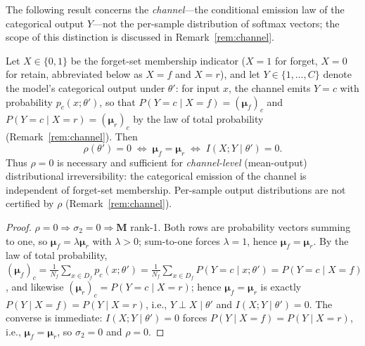 \documentclass[smallextended]{svjour3}       %
\begin{document}
The following result concerns the \emph{channel}---the conditional emission law of the categorical output $Y$---not the per-sample distribution of softmax vectors; the scope of this distinction is discussed in Remark~\ref{rem:channel}.

\begin{theorem}
\label{thm:perfect}
Let $X\in\{0,1\}$ be the forget-set membership indicator ($X{=}1$ for forget, $X{=}0$ for retain, abbreviated below as $X{=}f$ and $X{=}r$), and let $Y\in\{1,\dots,C\}$ denote the model's categorical output under $\theta'$: for input $x$, the channel emits $Y{=}c$ with probability $p_c(x;\theta')$, so that $P(Y{=}c\mid X{=}f)=(\boldsymbol{\mu}_f)_c$ and $P(Y{=}c\mid X{=}r)=(\boldsymbol{\mu}_r)_c$ by the law of total probability (Remark~\ref{rem:channel}). Then
\begin{equation}
\rho(\theta') = 0 \;\Longleftrightarrow\; \boldsymbol{\mu}_f = \boldsymbol{\mu}_r \;\Longleftrightarrow\; I(X; Y \mid \theta') = 0.
\end{equation}
Thus $\rho=0$ is necessary and sufficient for \emph{channel-level} (mean-output) distributional irreversibility: the categorical emission of the channel is independent of forget-set membership. Per-sample output distributions are not certified by $\rho$ (Remark~\ref{rem:channel}).
\end{theorem}

\begin{proof}
$\rho=0 \Rightarrow \sigma_2=0 \Rightarrow \mathbf{M}$ rank-1. Both rows are probability vectors summing to one, so $\boldsymbol{\mu}_f = \lambda\boldsymbol{\mu}_r$ with $\lambda>0$; sum-to-one forces $\lambda=1$, hence $\boldsymbol{\mu}_f=\boldsymbol{\mu}_r$. By the law of total probability, $(\boldsymbol{\mu}_f)_c = \frac{1}{N_f}\sum_{x\in D_f}p_c(x;\theta') = \frac{1}{N_f}\sum_{x\in D_f}P(Y{=}c\mid x;\theta') = P(Y{=}c\mid X{=}f)$, and likewise $(\boldsymbol{\mu}_r)_c = P(Y{=}c\mid X{=}r)$; hence $\boldsymbol{\mu}_f=\boldsymbol{\mu}_r$ is exactly $P(Y\mid X{=}f)=P(Y\mid X{=}r)$, i.e., $Y\perp X\mid\theta'$ and $I(X;Y\mid\theta')=0$. The converse is immediate: $I(X;Y\mid\theta')=0$ forces $P(Y\mid X{=}f)=P(Y\mid X{=}r)$, i.e., $\boldsymbol{\mu}_f=\boldsymbol{\mu}_r$, so $\sigma_2=0$ and $\rho=0$.
\end{proof}
\end{document}
